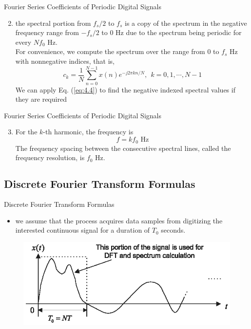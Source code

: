 \documentclass[pdflatex,compress,mathserif]{beamer}
\begin{document}
\begin{frame}{Fourier Series Coefficients of Periodic Digital Signals}
    \begin{enumerate}\setcounter{enumi}{1}
        \item the spectral portion from $f_s/2$ to $f_s$ is a copy of the spectrum in the negative frequency range from $-f_s/2$ to 0 Hz due to the spectrum being periodic for every $Nf_0$ Hz.\\ For convenience, we compute the spectrum over the range from 0 to $f_s$ Hz with nonnegative indices, that is,
        \begin{equation}
            c_k=\frac{1}{N} \sum_{n=0}^{N-1}x(n)e^{-j2\pi k n/N},~~k=0,1,\cdots,N-1
            \label{eq:4.5}
        \end{equation}
        We can apply Eq. (\ref{eq:4.4}) to find the negative indexed spectral values if they are required
    \end{enumerate}
\end{frame}

\begin{frame}{Fourier Series Coefficients of Periodic Digital Signals}
    \begin{enumerate}\setcounter{enumi}{2}
        \item For the $k$-th harmonic, the frequency is
        \begin{equation}
            f = kf_0 \text{ Hz}
        \end{equation}
        The frequency spacing between the consecutive spectral lines, called the frequency resolution, is $f_0$ Hz.
    \end{enumerate}
\end{frame}

\subsection{Discrete Fourier Transform Formulas}

\begin{frame}{Discrete Fourier Transform Formulas}
    \begin{itemize}
        \item we assume that the process acquires data samples from digitizing the interested continuous signal for a duration of $T_0$ seconds.
    \end{itemize}
    \begin{figure}
        \includegraphics[width=\linewidth]{fig/fig.4.06a}
    \end{figure}
\end{frame}
\end{document}
